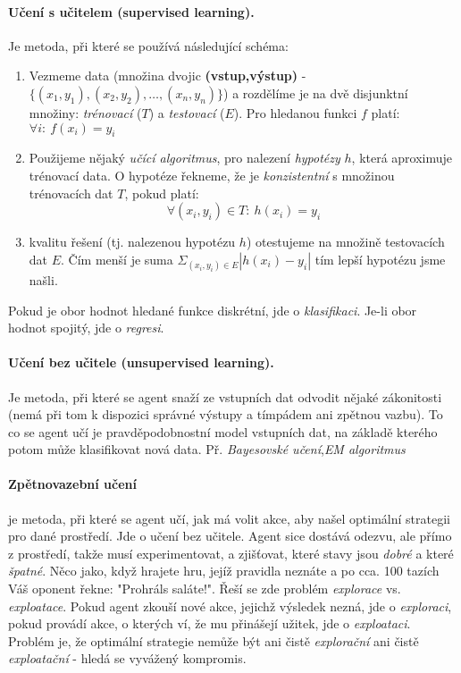 \documentclass[a4paper]{article}      %
\begin{document}
\paragraph{Učení s učitelem (supervised learning).} Je metoda, při které se používá následující schéma:
\begin{enumerate}
\item Vezmeme data (množina dvojic \textbf{(vstup,výstup)} - $\lbrace(x_1,y_1),(x_2,y_2),\ldots,(x_n,y_n)\rbrace$) a rozdělíme je na
dvě disjunktní množiny: \emph{trénovací} ($T$) a \emph{testovací} ($E$). Pro hledanou funkci $f$ platí: $\forall i:\ f(x_i)=y_i$
\item Použijeme nějaký \emph{učící algoritmus}, pro nalezení \emph{hypotézy} $h$, která aproximuje trénovací data.
O hypotéze řekneme, že je \emph{konzistentní} s množinou trénovacích dat $T$, pokud platí:
\[
\forall (x_i,y_i)\in T:\ h(x_i)=y_i
\]
\item kvalitu řešení (tj. nalezenou hypotézu $h$) otestujeme na množině testovacích dat $E$. Čím menší je suma $\Sigma_{(x_i,y_i)\in E}|h(x_i)-y_i|$ tím lepší hypotézu jsme našli.
\end{enumerate}
Pokud je obor hodnot hledané funkce diskrétní, jde o \emph{klasifikaci}. Je-li obor hodnot spojitý, jde o \emph{regresi}.

\paragraph{Učení bez učitele (unsupervised learning).} Je metoda, při které se agent snaží ze vstupních dat odvodit nějaké zákonitosti
(nemá při tom k dispozici správné výstupy a tímpádem ani zpětnou vazbu). To co se agent učí je pravděpodobnostní model vstupních dat, na základě kterého potom může klasifikovat nová data. Př. \emph{Bayesovské učení},\emph{EM algoritmus}

\paragraph{Zpětnovazební učení} je metoda, při které se agent učí, jak má volit akce, aby našel optimální strategii pro dané prostředí.
Jde o učení bez učitele. Agent sice dostává odezvu, ale přímo z prostředí, takže musí experimentovat, a zjišťovat, které stavy jsou \emph{dobré} a které \emph{špatné}. Něco jako, když hrajete hru, jejíž pravidla neznáte a po cca. 100 tazích Váš oponent řekne: "Prohráls saláte!".
Řeší se zde problém \emph{explorace} vs. \emph{exploatace}. Pokud agent zkouší nové akce, jejichž výsledek nezná, jde o \emph{exploraci}, pokud provádí akce, o kterých ví, že mu přinášejí užitek, jde o \emph{exploataci}. Problém je, že optimální strategie nemůže být ani čistě \emph{explorační} ani čistě \emph{exploatační} - hledá se vyvážený kompromis.
\end{document}
